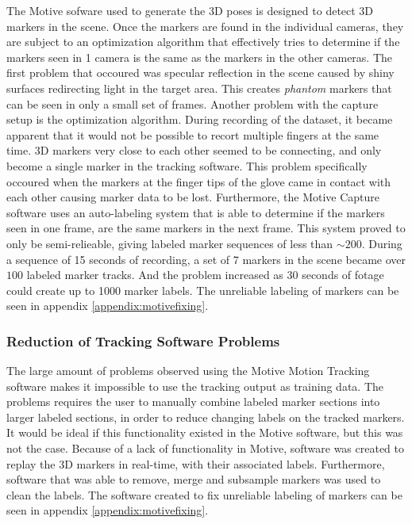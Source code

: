 \documentclass[../main.tex]{subfiles}
\begin{document}
The  Motive sofware used to generate the 3D poses is designed to detect 3D markers in the scene.
Once the markers are found in the individual cameras, they are subject to an optimization algorithm that effectively tries to determine if the markers seen in 1 camera is the same as the markers in the other cameras.
The first problem that occoured was specular reflection in the scene caused by shiny surfaces redirecting light in the target area.
This creates \textit{phantom} markers that can be seen in only a small set of frames.
Another problem with the capture setup is the optimization algorithm.
During recording of the dataset, it became apparent that it would not be possible to recort multiple fingers at the same time.
3D markers very close to each other seemed to be connecting, and only become a single marker in the tracking software.
This problem specifically occoured when the markers at the finger tips of the glove came in contact with each other causing marker data to be lost.
Furthermore, the Motive Capture software uses an auto-labeling system that is able to determine if the markers seen in one frame, are the same markers in the next frame.
This system proved to only be semi-relieable, giving labeled marker sequences of less than $\sim 200$.
During a sequence of 15 seconds of recording, a set of 7 markers in the scene became over $100$ labeled marker tracks. And the problem increased as 30 seconds of fotage could create up to 1000 marker labels.
The unreliable labeling of markers can be seen in appendix \ref{appendix:motivefixing}.



\subsubsection{Reduction of Tracking Software Problems}

The large amount of problems observed using the Motive Motion Tracking software makes it impossible to use the tracking output as training data.
The problems requires the user to manually combine labeled marker sections into larger labeled sections, in order to reduce changing labels on the tracked markers.
It would be ideal if this functionality existed in the Motive software, but this was not the case.
Because of a lack of functionality in Motive, software was created to replay the 3D markers in real-time, with their associated labels.
Furthermore, software that was able to remove, merge and subsample markers was used to clean the labels.
The software created to fix unreliable labeling of markers can be seen in appendix \ref{appendix:motivefixing}.
\end{document}
